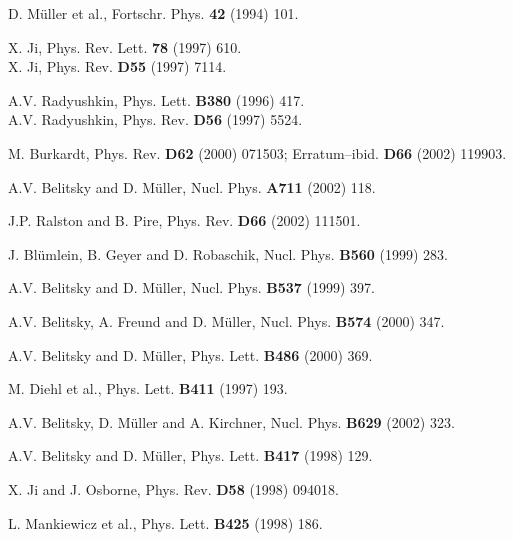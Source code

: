 \begin{thebibliography}{99}


D. M\"uller et al., Fortschr. Phys. {\bf 42} (1994) 101.


X. Ji, Phys. Rev. Lett. {\bf 78} (1997) 610. \\
X. Ji, Phys. Rev. {\bf D55} (1997) 7114.


A.V. Radyushkin, Phys. Lett. \textbf{B380} (1996) 417. \\
A.V. Radyushkin, Phys. Rev. {\bf D56} (1997) 5524.


M. Burkardt, 
Phys. Rev. {\bf D62} (2000) 071503; Erratum--ibid. {\bf D66} (2002) 119903. 

A.V. Belitsky and D. M\"uller, Nucl. Phys. {\bf A711} (2002) 118.

J.P. Ralston and B. Pire, 
Phys. Rev. {\bf D66} (2002) 111501.


J. Bl\"umlein, B. Geyer and D. Robaschik, 
Nucl. Phys. {\bf B560} (1999) 283.



A.V. Belitsky and D. M\"uller, 
Nucl. Phys. {\bf B537} (1999) 397.

A.V. Belitsky, A. Freund and D. M\"uller, 
Nucl. Phys. {\bf B574} (2000) 347.

A.V. Belitsky and D. M\"uller, %
Phys. Lett. {\bf B486} (2000) 369.


M. Diehl et al.,
Phys. Lett. {\bf B411} (1997) 193.


A.V. Belitsky, D. M\"uller and A. Kirchner, 
Nucl. Phys. {\bf B629} (2002) 323.


A.V. Belitsky and D. M\"uller, 
Phys. Lett. {\bf B417} (1998) 129.


X. Ji and J. Osborne, 
Phys. Rev. {\bf D58} (1998) 094018.


L. Mankiewicz et al., 
Phys. Lett. {\bf B425} (1998) 186.



\end{thebibliography}
